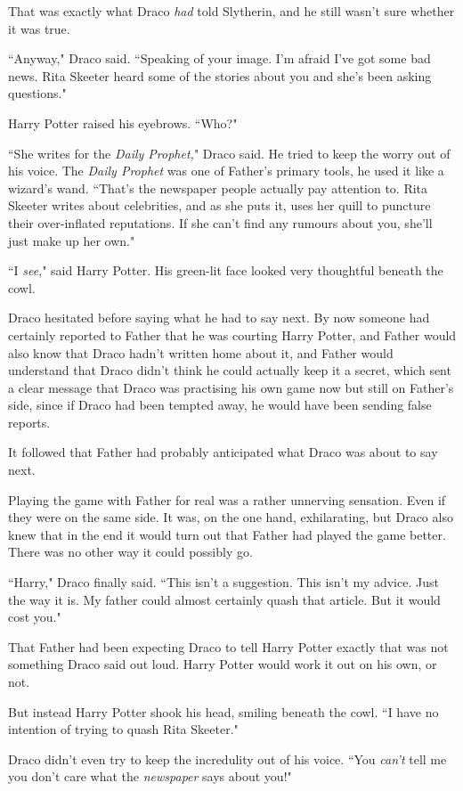 That was exactly what Draco \emph{had} told Slytherin, and he still wasn't sure whether it was true.

``Anyway," Draco said. ``Speaking of your image. I'm afraid I've got some bad news. Rita Skeeter heard some of the stories about you and she's been asking questions."

Harry Potter raised his eyebrows. ``Who?"

``She writes for the \emph{Daily Prophet,}" Draco said. He tried to keep the worry out of his voice. The \emph{Daily Prophet} was one of Father's primary tools, he used it like a wizard's wand. ``That's the newspaper people actually pay attention to. Rita Skeeter writes about celebrities, and as she puts it, uses her quill to puncture their over-inflated reputations. If she can't find any rumours about you, she'll just make up her own."

``I \emph{see}," said Harry Potter. His green-lit face looked very thoughtful beneath the cowl.

Draco hesitated before saying what he had to say next. By now someone had certainly reported to Father that he was courting Harry Potter, and Father would also know that Draco hadn't written home about it, and Father would understand that Draco didn't think he could actually keep it a secret, which sent a clear message that Draco was practising his own game now but still on Father's side, since if Draco had been tempted away, he would have been sending false reports.

It followed that Father had probably anticipated what Draco was about to say next.

Playing the game with Father for real was a rather unnerving sensation. Even if they were on the same side. It was, on the one hand, exhilarating, but Draco also knew that in the end it would turn out that Father had played the game better. There was no other way it could possibly go.

``Harry," Draco finally said. ``This isn't a suggestion. This isn't my advice. Just the way it is. My father could almost certainly quash that article. But it would cost you."

That Father had been expecting Draco to tell Harry Potter exactly that was not something Draco said out loud. Harry Potter would work it out on his own, or not.

But instead Harry Potter shook his head, smiling beneath the cowl. ``I have no intention of trying to quash Rita Skeeter."

Draco didn't even try to keep the incredulity out of his voice. ``You \emph{can't} tell me you don't care what the \emph{newspaper} says about you!"

